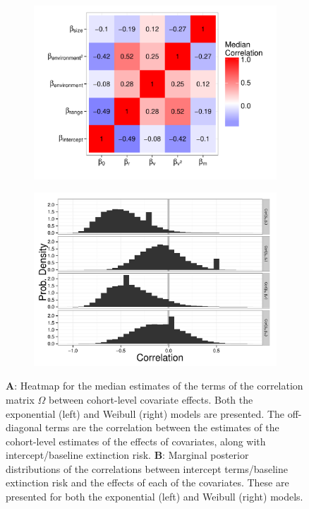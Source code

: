 \documentclass{article}
\begin{document}
\begin{figure}[ht]
  \centering
  \begin{subfigure}[b]{0.5\textwidth}
    \caption{}
    \includegraphics[height = 0.5\textheight,width=\textwidth,keepaspectratio=true]{figure/wei_cor_heatmap}
    \label{fig:omega}
  \end{subfigure}
  \begin{subfigure}[b]{0.4\textwidth}
    \caption{}
    \includegraphics[height = 0.5\textheight,width=\textwidth,keepaspectratio=true]{figure/correlation_marginal}
    \label{fig:corr}
  \end{subfigure}
  \caption{\textbf{A}: Heatmap for the median estimates of the terms of the correlation matrix \(\Omega\) between cohort-level covariate effects. Both the exponential (left) and Weibull (right) models are presented. The off-diagonal terms are the correlation between the estimates of the cohort-level estimates of the effects of covariates, along with intercept/baseline extinction risk. \textbf{B}: Marginal posterior distributions of the correlations between intercept terms/baseline extinction risk and the effects of each of the covariates. These are presented for both the exponential (left) and Weibull (right) models.}
  \label{fig:cor_posterior}
\end{figure}
\end{document}
